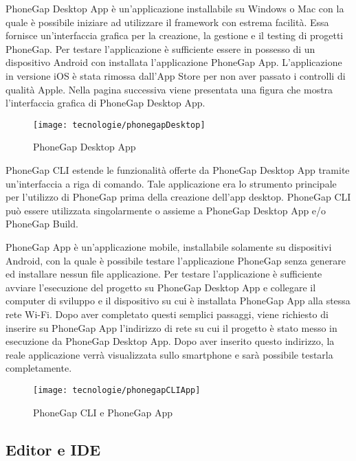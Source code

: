 PhoneGap Desktop App è un'applicazione installabile su Windows o Mac con la quale è possibile iniziare ad utilizzare il framework con estrema facilità. Essa fornisce un'interfaccia grafica per la creazione, la gestione e il testing di progetti PhoneGap. Per testare l'applicazione è sufficiente essere in possesso di un dispositivo Android con installata l'applicazione PhoneGap App. L'applicazione in versione iOS è stata rimossa dall'App Store per non aver passato i controlli di qualità Apple. Nella pagina successiva viene presentata una figura che mostra l'interfaccia grafica di PhoneGap Desktop App.

\begin{figure}[!h] 
    \centering 
    \texttt{[image: tecnologie/phonegapDesktop]} 
    \caption{PhoneGap Desktop App}
\end{figure}

\newpage

PhoneGap CLI estende le funzionalità offerte da PhoneGap Desktop App tramite un'interfaccia a riga di comando. Tale applicazione era lo strumento principale per l'utilizzo di PhoneGap prima della creazione dell'app desktop. PhoneGap CLI può essere utilizzata singolarmente o assieme a PhoneGap Desktop App e/o PhoneGap Build.

PhoneGap App è un'applicazione mobile, installabile solamente su dispositivi Android, con la quale è possibile testare l'applicazione PhoneGap senza generare ed installare nessun file applicazione. Per testare l'applicazione è sufficiente avviare l'esecuzione del progetto su PhoneGap Desktop App e collegare il computer di sviluppo e il dispositivo su cui è installata PhoneGap App alla stessa rete Wi-Fi. Dopo aver completato questi semplici passaggi, viene richiesto di inserire su PhoneGap App l'indirizzo di rete su cui il progetto è stato messo in esecuzione da PhoneGap Desktop App. Dopo aver inserito questo indirizzo, la reale applicazione verrà visualizzata sullo smartphone e sarà possibile testarla completamente.

\begin{figure}[!h] 
    \centering 
    \texttt{[image: tecnologie/phonegapCLIApp]} 
    \caption{PhoneGap CLI e PhoneGap App}
\end{figure}

\subsection{Editor e IDE}

